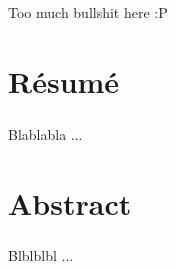 \documentclass[a4paper,11pt]{report}
\begin{document}
        \paragraph{}
Too much bullshit here :P
    \clearpage


%
\chapter*{Résumé}
        \paragraph{}
Blablabla ...
    \clearpage


%
\chapter*{Abstract}
        \paragraph{}
Blblblbl ...
    \clearpage


%

\clearpage


%


\end{document}
